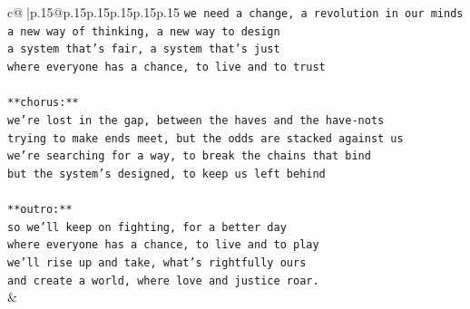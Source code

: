 \documentclass{article}
\begin{document}
{\begin{supertabular}{c@{$\;$}|p{.15\linewidth}@{}p{.15\linewidth}p{.15\linewidth}p{.15\linewidth}p{.15\linewidth}p{.15\linewidth}}
{{{\texttt{we need a change, a revolution in our minds} \\
\texttt{a new way of thinking, a new way to design} \\
\texttt{a system that's fair, a system that's just} \\
\texttt{where everyone has a chance, to live and to trust} \\
\\ 
\texttt{**chorus:**} \\
\texttt{we're lost in the gap, between the haves and the have{-}nots} \\
\texttt{trying to make ends meet, but the odds are stacked against us} \\
\texttt{we're searching for a way, to break the chains that bind} \\
\texttt{but the system's designed, to keep us left behind} \\
\\ 
\texttt{**outro:**} \\
\texttt{so we'll keep on fighting, for a better day} \\
\texttt{where everyone has a chance, to live and to play} \\
\texttt{we'll rise up and take, what's rightfully ours} \\
\texttt{and create a world, where love and justice roar.} \\
            }
        }
    }
    & \\ \\


\end{supertabular}}
\end{document}

